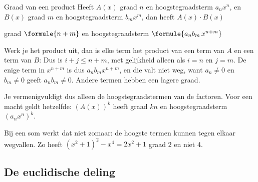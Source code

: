 \begin{theorie}
\begin{stelling}{Graad van een product}
Heeft $A(x)$ graad $n$ en hoogstegraadsterm $a_n x^n$, en $B(x)$ graad $m$ en hoogstegraadsterm $b_m x^m$, dan heeft $A(x) \cdot B(x)$

\qquad graad $\formule{n + m}$ \quad en hoogstegraadsterm \quad $\formule{a_n b_m\, x^{n+m}}$
\end{stelling}

\begin{bewijs}
Werk je het product uit, dan is elke term het product van een term van $A$ en een term van $B$:
Dus is $i + j \leqslant n + m$, met gelijkheid alleen als $i = n$ en $j = m$. De enige term in $x^{n+m}$ is dus $a_n b_m x^{n+m}$, en die valt niet weg, want $a_n \neq 0$ en $b_m \neq 0$ geeft $a_n b_m \neq 0$. Andere termen hebben een lagere graad.
\end{bewijs}
\end{theorie}

Je vermenigvuldigt dus alleen de hoogstegraadstermen van de factoren. Voor een macht geldt hetzelfde: $(A(x))^k$ heeft graad $kn$ en hoogstegraadsterm $(a_n x^n)^k$.


Bij een som werkt dat niet zomaar: de hoogste termen kunnen tegen elkaar wegvallen. Zo heeft $(x^2 + 1)^2 - x^4 = 2x^2 + 1$ graad 2 en niet 4.

\begin{oefeningen}
\end{oefeningen}

\subsection{De euclidische deling}

